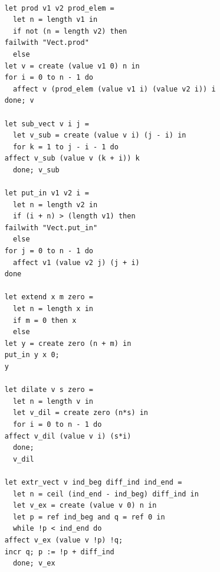 \documentclass[a4paper,10pt]{report}
\theoremstyle{break}
\begin{document}
    \begin{lstlisting}

    let prod v1 v2 prod_elem = 
      let n = length v1 in
      if not (n = length v2) then
	failwith "Vect.prod"
      else
	let v = create (value v1 0) n in
	for i = 0 to n - 1 do
	  affect v (prod_elem (value v1 i) (value v2 i)) i
	done; v

    let sub_vect v i j = 
      let v_sub = create (value v i) (j - i) in
      for k = 1 to j - i - 1 do
	affect v_sub (value v (k + i)) k
      done; v_sub

    let put_in v1 v2 i =
      let n = length v2 in
      if (i + n) > (length v1) then
	failwith "Vect.put_in"
      else
	for j = 0 to n - 1 do
	  affect v1 (value v2 j) (j + i)
	done

    let extend x m zero =
      let n = length x in
      if m = 0 then x
      else
	let y = create zero (n + m) in
	put_in y x 0;
	y

    let dilate v s zero = 
      let n = length v in
      let v_dil = create zero (n*s) in
      for i = 0 to n - 1 do
	affect v_dil (value v i) (s*i)
      done;
      v_dil
		
    let extr_vect v ind_beg diff_ind ind_end = 
      let n = ceil (ind_end - ind_beg) diff_ind in
      let v_ex = create (value v 0) n in
      let p = ref ind_beg and q = ref 0 in
      while !p < ind_end do
	affect v_ex (value v !p) !q;
	incr q; p := !p + diff_ind
      done; v_ex
	
    \end{lstlisting}
\newpage
\end{document}
